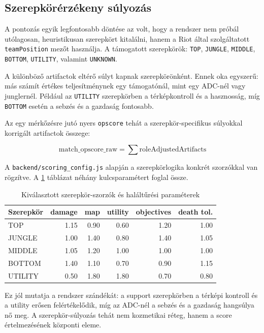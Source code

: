 \documentclass[a4paper,12pt]{report}
\begin{document}
\subsection{Szerepkörérzékeny súlyozás}

A pontozás egyik legfontosabb döntése az volt, hogy a rendszer nem próbál utólagosan, heuristikusan szerepkört kitalálni, hanem a Riot által szolgáltatott \texttt{teamPosition} mezőt használja. A támogatott szerepkörök: \texttt{TOP}, \texttt{JUNGLE}, \texttt{MIDDLE}, \texttt{BOTTOM}, \texttt{UTILITY}, valamint \texttt{UNKNOWN}.

A különböző artifactok eltérő súlyt kapnak szerepkörönként. Ennek oka egyszerű: más számít értékes teljesítménynek egy támogatónál, mint egy ADC-nél vagy junglernél. Például az \texttt{UTILITY} szerepkörben a térképkontroll és a hasznosság, míg \texttt{BOTTOM} esetén a sebzés és a gazdaság fontosabb.

Az egy mérkőzésre jutó nyers \texttt{opscore} tehát a szerepkör-specifikus súlyokkal korrigált artifactok összege:

\begin{equation}
\text{match\_opscore\_raw} = \sum \text{roleAdjustedArtifacts}
\end{equation}

A \texttt{backend/scoring\_config.js} alapján a szerepkörlogika konkrét szorzókkal van rögzítve. A \ref{tab:rolemultipliers} táblázat néhány kulcsparamétert foglal össze.

\begin{table}[H]
\centering
\caption{Kiválasztott szerepkör-szorzók és haláltűrési paraméterek}
\label{tab:rolemultipliers}
\begin{tabular}{lrrrrr}
\toprule
\textbf{Szerepkör} & \textbf{damage} & \textbf{map} & \textbf{utility} & \textbf{objectives} & \textbf{death tol.} \\
\midrule
TOP & 1.15 & 0.90 & 0.60 & 1.20 & 1.00 \\
JUNGLE & 1.00 & 1.40 & 0.80 & 1.40 & 1.05 \\
MIDDLE & 1.05 & 1.20 & 1.00 & 1.00 & 1.00 \\
BOTTOM & 1.40 & 1.10 & 0.70 & 0.90 & 1.15 \\
UTILITY & 0.50 & 1.80 & 1.80 & 0.70 & 0.80 \\
\bottomrule
\end{tabular}
\end{table}

Ez jól mutatja a rendszer szándékát: a support szerepkörben a térképi kontroll és a utility erősen felértékelődik, míg az ADC-nél a sebzés és a gazdaság hangsúlya nő meg. A szerepkör-súlyozás tehát nem kozmetikai réteg, hanem a score értelmezésének központi eleme.
\end{document}
